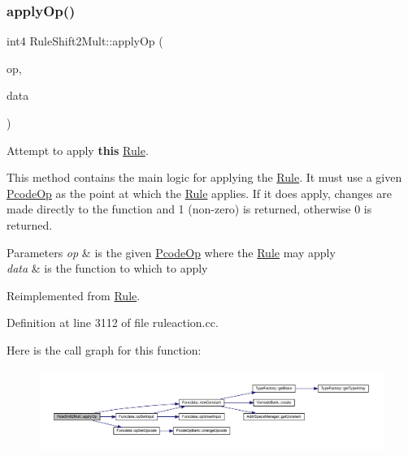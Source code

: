 \subsubsection{\texorpdfstring{applyOp()}{applyOp()}}
{\footnotesize\ttfamily int4 Rule\+Shift2\+Mult\+::apply\+Op (\begin{DoxyParamCaption}\item[{\mbox{\hyperlink{class_pcode_op}{Pcode\+Op}} $\ast$}]{op,  }\item[{\mbox{\hyperlink{class_funcdata}{Funcdata}} \&}]{data }\end{DoxyParamCaption})\hspace{0.3cm}{\ttfamily [virtual]}}



Attempt to apply {\bfseries{this}} \mbox{\hyperlink{class_rule}{Rule}}. 

This method contains the main logic for applying the \mbox{\hyperlink{class_rule}{Rule}}. It must use a given \mbox{\hyperlink{class_pcode_op}{Pcode\+Op}} as the point at which the \mbox{\hyperlink{class_rule}{Rule}} applies. If it does apply, changes are made directly to the function and 1 (non-\/zero) is returned, otherwise 0 is returned. 
\begin{DoxyParams}{Parameters}
{\em op} & is the given \mbox{\hyperlink{class_pcode_op}{Pcode\+Op}} where the \mbox{\hyperlink{class_rule}{Rule}} may apply \\
\hline
{\em data} & is the function to which to apply \\
\hline
\end{DoxyParams}


Reimplemented from \mbox{\hyperlink{class_rule_a4e3e61f066670175009f60fb9dc60848}{Rule}}.



Definition at line 3112 of file ruleaction.\+cc.

Here is the call graph for this function\+:
\nopagebreak
\begin{figure}[H]
\begin{center}
\leavevmode
\includegraphics[width=350pt]{class_rule_shift2_mult_a72b5072e94341325dd65f0d48dbb2a04_cgraph}
\end{center}
\end{figure}
\mbox{\label{class_rule_shift2_mult_a26da49bb955581c220a082aae5e8f546}} 
